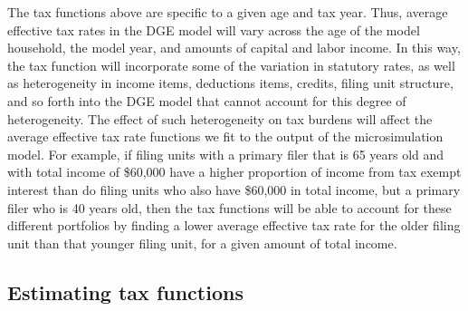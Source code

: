 \documentclass[letterpaper,12pt]{article}
\theoremstyle{definition}
\begin{document}
\begin{spacing}{1.5}

    The tax functions above are specific to a given age and tax year.  Thus, average effective tax rates in the DGE model will vary across the age of the model household, the model year, and amounts of capital and labor income.  In this way, the tax function will incorporate some of the variation in statutory rates, as well as heterogeneity in income items, deductions items, credits, filing unit structure, and so forth into the DGE model that cannot account for this degree of heterogeneity.  The effect of such heterogeneity on tax burdens will affect the average effective tax rate functions we fit to the output of the microsimulation model.  For example, if filing units with a primary filer that is 65 years old and with total income of \$60,000 have a higher proportion of income from tax exempt interest than do filing units who also have \$60,000 in total income, but a primary filer who is 40 years old, then the tax functions will be able to account for these different portfolios by finding a lower average effective tax rate for the older filing unit than that younger filing unit, for a given amount of total income.


  \subsection{Estimating tax functions}\label{SecEstTaxFunc}


\end{spacing}
\end{document}
